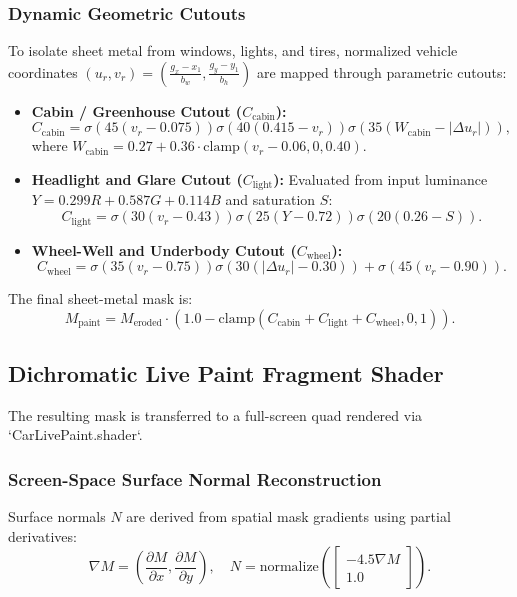 \documentclass[10pt,journal,compsoc]{IEEEtran}
\begin{document}
\subsubsection{Dynamic Geometric Cutouts}
To isolate sheet metal from windows, lights, and tires, normalized vehicle coordinates $(u_r, v_r) = \left(\frac{g_x - x_1}{b_w}, \frac{g_y - y_1}{b_h}\right)$ are mapped through parametric cutouts:
\begin{itemize}
    \item \textbf{Cabin / Greenhouse Cutout ($C_{\text{cabin}}$):}
    \begin{equation}
        C_{\text{cabin}} = \sigma(45(v_r - 0.075)) \sigma(40(0.415 - v_r)) \sigma(35(W_{\text{cabin}} - |\Delta u_r|)),
    \end{equation}
    where $W_{\text{cabin}} = 0.27 + 0.36 \cdot \text{clamp}(v_r - 0.06, 0, 0.40)$.
    \item \textbf{Headlight and Glare Cutout ($C_{\text{light}}$):} Evaluated from input luminance $Y = 0.299R + 0.587G + 0.114B$ and saturation $S$:
    \begin{equation}
        C_{\text{light}} = \sigma(30(v_r - 0.43)) \sigma(25(Y - 0.72)) \sigma(20(0.26 - S)).
    \end{equation}
    \item \textbf{Wheel-Well and Underbody Cutout ($C_{\text{wheel}}$):}
    \begin{equation}
        C_{\text{wheel}} = \sigma(35(v_r - 0.75))\sigma(30(|\Delta u_r| - 0.30)) + \sigma(45(v_r - 0.90)).
    \end{equation}
\end{itemize}
The final sheet-metal mask is:
\begin{equation}
    M_{\text{paint}} = M_{\text{eroded}} \cdot (1.0 - \text{clamp}(C_{\text{cabin}} + C_{\text{light}} + C_{\text{wheel}}, 0, 1)).
\end{equation}

\subsection{Dichromatic Live Paint Fragment Shader}
The resulting mask is transferred to a full-screen quad rendered via `CarLivePaint.shader`.

\subsubsection{Screen-Space Surface Normal Reconstruction}
Surface normals $N$ are derived from spatial mask gradients using partial derivatives:
\begin{equation}
    \nabla M = \left(\frac{\partial M}{\partial x}, \frac{\partial M}{\partial y}\right), \quad N = \text{normalize}\left(\begin{bmatrix} -4.5 \nabla M \\ 1.0 \end{bmatrix}\right).
\end{equation}
\end{document}
